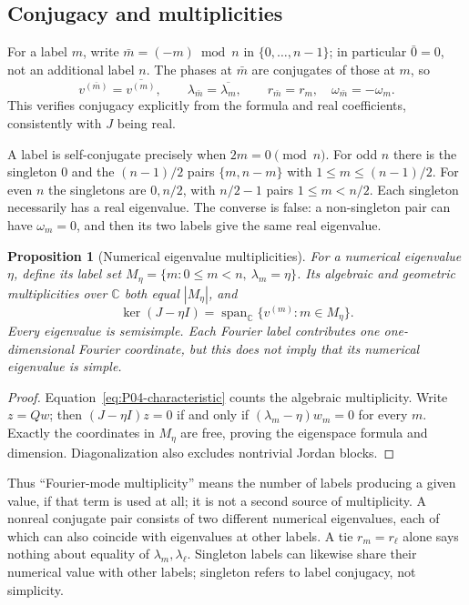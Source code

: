 \documentclass[11pt]{article}
\newcommand{\C}{\mathbb{C}}
\newtheorem{proposition}[theorem]{Proposition}
\theoremstyle{definition}
\theoremstyle{remark}
\begin{document}
\subsection{Conjugacy and multiplicities}

For a label $m$, write $\bar m=(-m)\bmod n$ in $\{0,\ldots,n-1\}$;
in particular $\bar0=0$, not an additional label $n$.
The phases at $\bar m$ are conjugates of those at $m$, so
\begin{equation}
 v^{(\bar m)}=\overline{v^{(m)}},\qquad
 \lambda_{\bar m}=\overline{\lambda_m},\qquad
 r_{\bar m}=r_m,\quad \omega_{\bar m}=-\omega_m.
 \label{eq:P04-conjugacy}
\end{equation}
This verifies conjugacy explicitly from the formula and real
coefficients, consistently with $J$ being real.

A label is self-conjugate precisely when $2m=0\pmod n$.
For odd $n$ there is the singleton $0$ and the $(n-1)/2$ pairs
$\{m,n-m\}$ with $1\le m\le(n-1)/2$.
For even $n$ the singletons are $0,n/2$, with $n/2-1$ pairs
$1\le m<n/2$. Each singleton necessarily has a real eigenvalue.
The converse is false: a non-singleton pair can have $\omega_m=0$,
and then its two labels give the same real eigenvalue.

\begin{proposition}[Numerical eigenvalue multiplicities]
\label{prop:P04-multiplicity}
For a numerical eigenvalue $\eta$, define its label set
$M_\eta=\{m:0\le m<n,\ \lambda_m=\eta\}$.
Its algebraic and geometric multiplicities over $\C$ both equal
$|M_\eta|$, and
\[
 \ker(J-\eta I)=\operatorname{span}_{\C}
                  \{v^{(m)}:m\in M_\eta\}.
\]
Every eigenvalue is semisimple. Each Fourier label contributes one
one-dimensional Fourier coordinate, but this does not imply that
its numerical eigenvalue is simple.
\end{proposition}
\begin{proof}
Equation~\eqref{eq:P04-characteristic} counts the algebraic
multiplicity. Write $z=Qw$; then $(J-\eta I)z=0$ if and only if
$(\lambda_m-\eta)w_m=0$ for every $m$. Exactly the coordinates in
$M_\eta$ are free, proving the eigenspace formula and dimension.
Diagonalization also excludes nontrivial Jordan blocks.
\end{proof}

Thus ``Fourier-mode multiplicity'' means the number of labels
producing a given value, if that term is used at all; it is not a
second source of multiplicity. A nonreal conjugate pair consists
of two different numerical eigenvalues, each of which can also
coincide with eigenvalues at other labels. A tie $r_m=r_\ell$
alone says nothing about equality of $\lambda_m,\lambda_\ell$.
Singleton labels can likewise share their numerical value with
other labels; singleton refers to label conjugacy, not simplicity.
\end{document}
